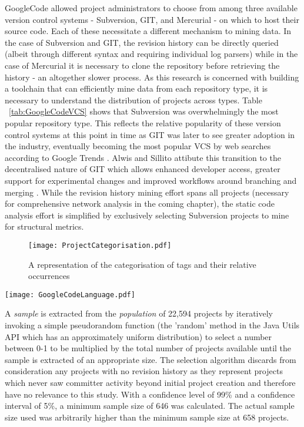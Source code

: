 GoogleCode allowed project administrators to choose from among three available version control systems - Subversion, GIT, and Mercurial - on which to host their source code. Each of these necessitate a different mechanism to mining data. In the case of Subversion and GIT, the revision history can be directly queried (albeit through different syntax and requiring individual log parsers) while in the case of Mercurial it is necessary to clone the repository before retrieving the history - an altogether slower process. As this research is concerned with building a toolchain that can efficiently mine data from each repository type, it is necessary to understand the distribution of projects across types. Table ~\ref{tab:GoogleCodeVCS} shows that Subversion was overwhelmingly the most popular repository type. This reflects the relative popularity of these version control systems at this point in time as GIT was later to see greater adoption in the industry, eventually becoming the most popular VCS by web searches according to Google Trends \citep{rhodecode}. Alwis and Sillito attibute this transition to the decentralised nature of GIT which allows enhanced developer access, greater support for experimental changes and improved workflows around branching and merging \citep{de2009software}. While the revision history mining effort spans all projects (necessary for comprehensive network analysis in the coming chapter), the static code analysis effort is simplified by exclusively selecting Subversion projects to mine for structural metrics.

\begin{figure}[htbp!] 
\centering    
\texttt{[image: ProjectCategorisation.pdf]}
\caption{A representation of the categorisation of tags and their relative occurrences}
\label{fig:ProjectCategorisation}
\end{figure}

\begin{table}
\centering 
{}
\begin{tabular}
 \centering 
 \texttt{[image: GoogleCodeLanguage.pdf]}
 \label{tab:GoogleCodeLanguage}
\end{tabular}
\end{table}

A \textit{sample} is extracted from the \textit{population} of 22,594 projects by iteratively invoking a simple pseudorandom function (the 'random' method in the Java Utils API which has an approximately uniform distribution) to select a number between 0-1 to be multiplied by the total number of projects available until the sample is extracted of an appropriate size. The selection algorithm discards from consideration any projects with no revision history as they represent projects which never saw committer activity beyond initial project creation and therefore have no relevance to this study. With a confidence level of 99\% and a confidence interval of 5\%, a minimum sample size of 646 was calculated. The actual sample size used was arbitrarily higher than the minimum sample size at 658 projects. 

